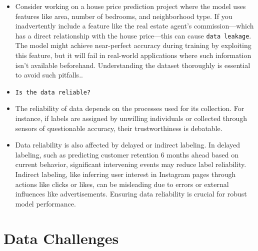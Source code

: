 \documentclass[serif, aspectratio=169]{beamer}
\begin{document}
\begin{frame}
    \begin{itemize}{Data Leakage}
        \item Consider working on a house price prediction project where the model uses features like area, number of bedrooms, and neighborhood type. If you inadvertently include a feature like the real estate agent's commission—which has a direct relationship with the house price—this can cause \texttt{\color{red}data leakage}. The model might achieve near-perfect accuracy during training by exploiting this feature, but it will fail in real-world applications where such information isn’t available beforehand. Understanding the dataset thoroughly is essential to avoid such pitfalls..
    \end{itemize}
\end{frame}

\begin{frame}
    \begin{itemize}
        \item \texttt{\color{red}Is the data reliable?} 
        \item The reliability of data depends on the processes used for its collection. For instance, if labels are assigned by unwilling individuals or collected through sensors of questionable accuracy, their trustworthiness is debatable.

        \item Data reliability is also affected by delayed or indirect labeling. In delayed labeling, such as predicting customer retention 6 months ahead based on current behavior, significant intervening events may reduce label reliability. Indirect labeling, like inferring user interest in Instagram pages through actions like clicks or likes, can be misleading due to errors or external influences like advertisements. Ensuring data reliability is crucial for robust model performance.
    \end{itemize}
\end{frame}

\section{Data Challenges}
\end{document}
